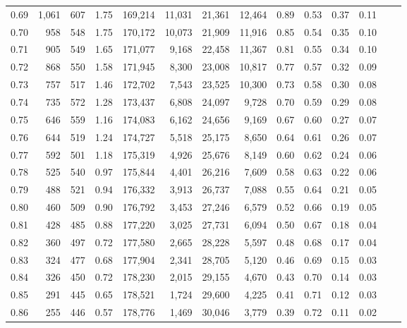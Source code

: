 \begin{tabular}{rrrrrrrrrrrrrr}
0.69 &  1,061 &  607 &    1.75 &  169,214 &   11,031 &  21,361 &  12,464 &  0.89 &  0.53 &  0.37 &      0.11 \\
0.70 &    958 &  548 &    1.75 &  170,172 &   10,073 &  21,909 &  11,916 &  0.85 &  0.54 &  0.35 &      0.10 \\
0.71 &    905 &  549 &    1.65 &  171,077 &    9,168 &  22,458 &  11,367 &  0.81 &  0.55 &  0.34 &      0.10 \\
0.72 &    868 &  550 &    1.58 &  171,945 &    8,300 &  23,008 &  10,817 &  0.77 &  0.57 &  0.32 &      0.09 \\
0.73 &    757 &  517 &    1.46 &  172,702 &    7,543 &  23,525 &  10,300 &  0.73 &  0.58 &  0.30 &      0.08 \\
0.74 &    735 &  572 &    1.28 &  173,437 &    6,808 &  24,097 &   9,728 &  0.70 &  0.59 &  0.29 &      0.08 \\
0.75 &    646 &  559 &    1.16 &  174,083 &    6,162 &  24,656 &   9,169 &  0.67 &  0.60 &  0.27 &      0.07 \\
0.76 &    644 &  519 &    1.24 &  174,727 &    5,518 &  25,175 &   8,650 &  0.64 &  0.61 &  0.26 &      0.07 \\
0.77 &    592 &  501 &    1.18 &  175,319 &    4,926 &  25,676 &   8,149 &  0.60 &  0.62 &  0.24 &      0.06 \\
0.78 &    525 &  540 &    0.97 &  175,844 &    4,401 &  26,216 &   7,609 &  0.58 &  0.63 &  0.22 &      0.06 \\
0.79 &    488 &  521 &    0.94 &  176,332 &    3,913 &  26,737 &   7,088 &  0.55 &  0.64 &  0.21 &      0.05 \\
0.80 &    460 &  509 &    0.90 &  176,792 &    3,453 &  27,246 &   6,579 &  0.52 &  0.66 &  0.19 &      0.05 \\
0.81 &    428 &  485 &    0.88 &  177,220 &    3,025 &  27,731 &   6,094 &  0.50 &  0.67 &  0.18 &      0.04 \\
0.82 &    360 &  497 &    0.72 &  177,580 &    2,665 &  28,228 &   5,597 &  0.48 &  0.68 &  0.17 &      0.04 \\
0.83 &    324 &  477 &    0.68 &  177,904 &    2,341 &  28,705 &   5,120 &  0.46 &  0.69 &  0.15 &      0.03 \\
0.84 &    326 &  450 &    0.72 &  178,230 &    2,015 &  29,155 &   4,670 &  0.43 &  0.70 &  0.14 &      0.03 \\
0.85 &    291 &  445 &    0.65 &  178,521 &    1,724 &  29,600 &   4,225 &  0.41 &  0.71 &  0.12 &      0.03 \\
0.86 &    255 &  446 &    0.57 &  178,776 &    1,469 &  30,046 &   3,779 &  0.39 &  0.72 &  0.11 &      0.02 \\

\end{tabular}
